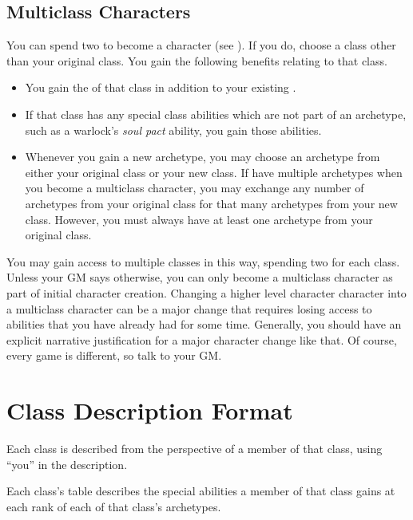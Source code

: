         \subsection{Multiclass Characters}\label{Multiclass Characters}
            You can spend two  to become a  character (see ).
            If you do, choose a class other than your original class.
            You gain the following benefits relating to that class.
            \begin{itemize}
                \item You gain the  of that class in addition to your existing .
                \item If that class has any special class abilities which are not part of an archetype, such as a warlock's \textit{soul pact} ability, you gain those abilities.
                \item Whenever you gain a new archetype, you may choose an archetype from either your original class or your new class.
                    If have multiple archetypes when you become a multiclass character, you may exchange any number of archetypes from your original class for that many archetypes from your new class.
                    However, you must always have at least one archetype from your original class.
            \end{itemize}

            You may gain access to multiple classes in this way, spending two  for each class.
            Unless your GM says otherwise, you can only become a multiclass character as part of initial character creation.
            Changing a higher level character character into a multiclass character can be a major change that requires losing access to abilities that you have already had for some time.
            Generally, you should have an explicit narrative justification for a major character change like that.
            Of course, every game is different, so talk to your GM.

\section{Class Description Format}
    Each class is described from the perspective of a member of that class, using ``you'' in the description.

    Each class's table describes the special abilities a member of that class gains at each rank of each of that class's archetypes.

